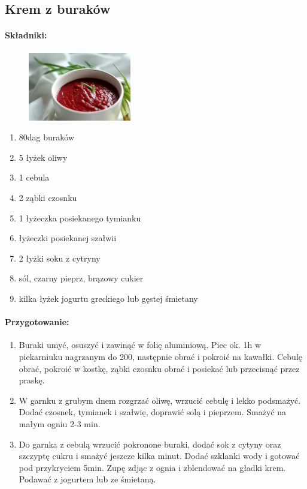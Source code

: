 \documentclass{article}
\begin{document}
    \subsection{Krem z buraków}
    \bigskip
    \paragraph{Składniki:}
    \begin{figure}
        \includegraphics[width=0.4\textwidth]{krem_z_burakow.jpg}
    \end{figure}
    \begin{enumerate}
        \item 80dag buraków
        \item 5 łyżek oliwy
        \item 1 cebula
        \item 2 ząbki czosnku
        \item 1 łyżeczka posiekanego tymianku
        \item {} łyżeczki posiekanej szałwii
        \item 2 łyżki soku z cytryny
        \item sól, czarny pieprz, brązowy cukier
        \item kilka łyżek jogurtu greckiego lub gęstej śmietany
    \end{enumerate}

    \paragraph{Przygotowanie:}
    \begin{enumerate}
        \item Buraki umyć, osuszyć i zawinąć w folię aluminiową. Piec ok. 1h w
            piekarniuku nagrzanym do 200\celsius, następnie obrać i pokroić na
            kawałki. Cebulę obrać, pokroić w kostkę, ząbki czosnku obrać i
            posiekać lub przecisnąć przez praskę.
        \item W garnku z grubym dnem rozgrzać oliwę, wrzucić cebulę i lekko
            podsmażyć. Dodać czosnek, tymianek i szałwię, doprawić solą i
            pieprzem. Smażyć na małym ogniu 2-3 min.
        \item Do garnka z cebulą wrzucić pokronone buraki, dodać sok z cytyny
            oraz szczyptę cukru i smażyć jeszcze kilka minut. Dodać 
            szklanki wody i gotować pod przykryciem 5min. Zupę zdjąc z ognia i
            zblendować na gładki krem. Podawać z jogurtem lub ze śmietaną.
    \end{enumerate}
    \newpage
\end{document}
